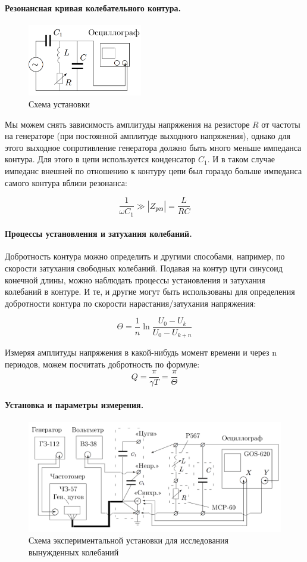 \documentclass{lab_class}
\begin{document}
\paragraph{Резонансная кривая колебательного контура.}
\begin{figure}
\centering
\includegraphics[width=5cm]{Fig2.png}
\caption{Схема установки}
\end{figure} 

Мы можем снять зависимость амплитуды напряжения на резисторе $R$ от частоты на генераторе (при постоянной амплитуде выходного напряжения), однако для этого выходное сопротивление генератора должно быть много меньше импеданса контура. Для этого в цепи используется конденсатор $C_1$. И в таком случае импеданс внешней по отношению к контуру цепи был гораздо больше импеданса самого контура вблизи резонанса:

$$\dfrac{1}{\omega C_1} \gg |Z_\text{рез}| = \dfrac{L}{RC} $$

\paragraph{Процессы установления и затухания колебаний.}
Добротность контура можно определить и другими способами, например, по скорости затухания свободных колебаний. Подавая на контур цуги синусоид конечной длины, можно наблюдать процессы установления и затухания колебаний в контуре. И те, и другие могут быть использованы для определения добротности контура по скорости нарастания/затухания напряжения:

$$\Theta = \dfrac{1}{n} \ln \dfrac{U_0 - U_k}{U_0-U_{k+n}} $$

Измеряя амплитуды напряжения в какой-нибудь момент времени и через n периодов, можем посчитать добротность по формуле:
$$Q = \dfrac{\pi}{\gamma 	T} = \dfrac{\pi}{\Theta}$$

\paragraph{Установка и параметры измерения.}
\begin{figure}[H]
\centering
\includegraphics[width = 0.9 \textwidth]{Fig.png}
\caption{Схема экспериментальной установки для исследования вынужденных колебаний}
\end{figure}
\end{document}
